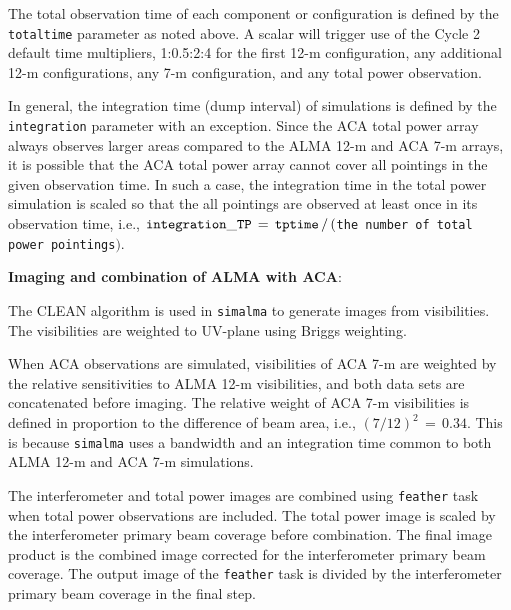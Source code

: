 The total observation time of each component or configuration is
defined by the {\tt totaltime} parameter as noted above.  A scalar
will trigger use of the Cycle 2 default time multipliers, 1:0.5:2:4
for the first 12-m configuration, any additional 12-m configurations,
any 7-m configuration, and any total power observation.

In general, the integration time (dump interval) of simulations is
defined by the {\tt integration} parameter with an exception.  Since
the ACA total power array always observes larger areas compared to the
ALMA 12-m and ACA 7-m arrays, it is possible that the ACA total power
array cannot cover all pointings in the given observation time.  In
such a case, the integration time in the total power simulation is
scaled so that the all pointings are observed at least once in its
observation time, i.e., ${\tt integration\_TP} \, = \, {\tt tptime} \,
/ \, ( ${\tt the number of total power pointings}$ ) $.


\medskip
{\bf Imaging and combination of ALMA with ACA}:

The CLEAN algorithm is used in {\tt simalma} to generate images
from visibilities. The visibilities are weighted to UV-plane using
Briggs weighting.

When ACA observations are simulated, visibilities of ACA 7-m are
weighted by the relative sensitivities to ALMA 12-m visibilities, 
and both data sets are concatenated before imaging. 
The relative weight of ACA 7-m visibilities is defined in proportion
to the difference of beam area, i.e., $ (7/12)^2 \, = \, 0.34 $.
This is because {\tt simalma} uses a bandwidth and an integration time
common to both ALMA 12-m and ACA 7-m simulations.

The interferometer and total power images are combined using 
{\tt feather} task when total power observations are included.
The total power image is scaled by the interferometer primary beam
coverage before combination. 
The final image product is the combined image corrected for the
interferometer primary beam coverage. The output image of the
{\tt feather} task is divided by the interferometer primary beam
coverage in the final step.

